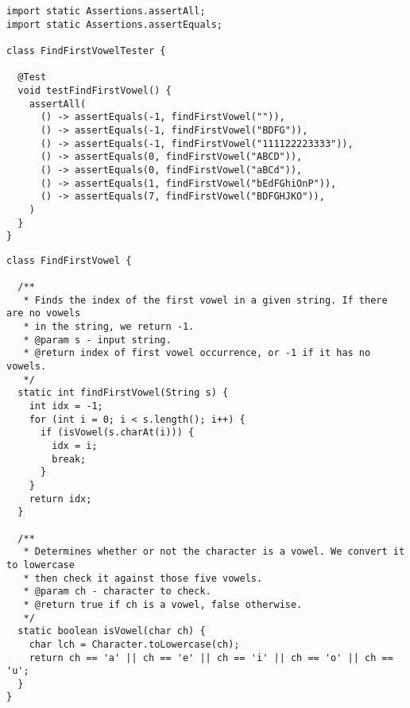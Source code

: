 
\begin{cl}{}
\begin{lstlisting}[language=MyJava]
import static Assertions.assertAll;
import static Assertions.assertEquals;

class FindFirstVowelTester {

  @Test
  void testFindFirstVowel() {
    assertAll(
      () -> assertEquals(-1, findFirstVowel("")),
      () -> assertEquals(-1, findFirstVowel("BDFG")),
      () -> assertEquals(-1, findFirstVowel("111122223333")),
      () -> assertEquals(0, findFirstVowel("ABCD")),
      () -> assertEquals(0, findFirstVowel("aBCd")),
      () -> assertEquals(1, findFirstVowel("bEdFGhiOnP")),
      () -> assertEquals(7, findFirstVowel("BDFGHJKO")),
    )
  }
}
\end{lstlisting}
\end{cl}

\begin{cl}{}
\begin{lstlisting}[language=MyJava]
class FindFirstVowel {

  /**
   * Finds the index of the first vowel in a given string. If there are no vowels
   * in the string, we return -1.
   * @param s - input string.
   * @return index of first vowel occurrence, or -1 if it has no vowels.
   */
  static int findFirstVowel(String s) {
    int idx = -1;
    for (int i = 0; i < s.length(); i++) {
      if (isVowel(s.charAt(i))) {
        idx = i;
        break;
      }
    }
    return idx;
  }

  /**
   * Determines whether or not the character is a vowel. We convert it to lowercase
   * then check it against those five vowels.
   * @param ch - character to check.
   * @return true if ch is a vowel, false otherwise.
   */
  static boolean isVowel(char ch) {
    char lch = Character.toLowercase(ch);
    return ch == 'a' || ch == 'e' || ch == 'i' || ch == 'o' || ch == 'u';
  }
}
\end{lstlisting}
\end{cl}

